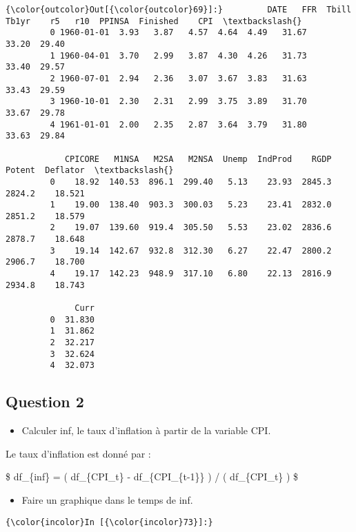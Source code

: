 \documentclass[11pt]{article}
\providecommand{\tightlist}{%
      \setlength{\itemsep}{0pt}\setlength{\parskip}{0pt}}
\begin{document}
\begin{Verbatim}[commandchars=\\\{\}]
{\color{outcolor}Out[{\color{outcolor}69}]:}         DATE   FFR  Tbill  Tb1yr    r5   r10  PPINSA  Finished    CPI  \textbackslash{}
         0 1960-01-01  3.93   3.87   4.57  4.64  4.49   31.67     33.20  29.40   
         1 1960-04-01  3.70   2.99   3.87  4.30  4.26   31.73     33.40  29.57   
         2 1960-07-01  2.94   2.36   3.07  3.67  3.83   31.63     33.43  29.59   
         3 1960-10-01  2.30   2.31   2.99  3.75  3.89   31.70     33.67  29.78   
         4 1961-01-01  2.00   2.35   2.87  3.64  3.79   31.80     33.63  29.84   
         
            CPICORE   M1NSA   M2SA   M2NSA  Unemp  IndProd    RGDP  Potent  Deflator  \textbackslash{}
         0    18.92  140.53  896.1  299.40   5.13    23.93  2845.3  2824.2    18.521   
         1    19.00  138.40  903.3  300.03   5.23    23.41  2832.0  2851.2    18.579   
         2    19.07  139.60  919.4  305.50   5.53    23.02  2836.6  2878.7    18.648   
         3    19.14  142.67  932.8  312.30   6.27    22.47  2800.2  2906.7    18.700   
         4    19.17  142.23  948.9  317.10   6.80    22.13  2816.9  2934.8    18.743   
         
              Curr  
         0  31.830  
         1  31.862  
         2  32.217  
         3  32.624  
         4  32.073  
\end{Verbatim}
            
    \subsection{Question 2}\label{question-2}

\begin{itemize}
\tightlist
\item
  Calculer inf, le taux d'inflation à partir de la variable CPI. 
\end{itemize}

    Le taux d'inflation est donné par :

\$ df\_\{inf\} = ( df\_\{CPI\_t\} - df\_\{CPI\_\{t-1\}\} ) / (
df\_\{CPI\_t\} ) \$

    \begin{itemize}
\tightlist
\item
  Faire un graphique dans le temps de inf. 
\end{itemize}

    \begin{Verbatim}[commandchars=\\\{\}]
{\color{incolor}In [{\color{incolor}73}]:} 
\end{Verbatim}
\end{document}
